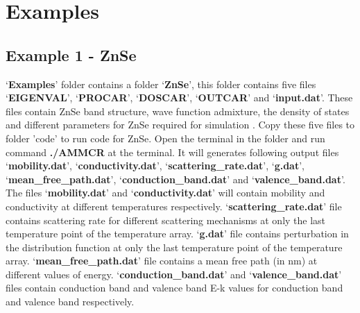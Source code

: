 \documentclass[12pt]{article}
\begin{document}
\section{Examples} \label{examples}
\subsection{Example 1 - ZnSe}
\lq \textbf{Examples}\rq \hspace{0.5mm} folder contains a folder \lq \textbf{ZnSe}\rq \hspace{0.5mm}, this folder contains five files \lq \textbf{EIGENVAL}\rq \hspace{0.5mm}, \lq \textbf{PROCAR}\rq \hspace{0.5mm}, \lq \textbf{DOSCAR}\rq \hspace{0.5mm}, \lq \textbf{OUTCAR}\rq \hspace{0.5mm} and \lq \textbf{input.dat}\rq \hspace{0.5mm}. These files contain ZnSe band structure, wave function admixture, the density of states and different parameters for ZnSe required for simulation \cite{anup1}. Copy these five files to folder 'code' to run code for ZnSe. Open the terminal in the folder and run command \textbf{./AMMCR} at the terminal. It will generates following output files \lq \textbf{mobility.dat}\rq \hspace{0.5mm}, \lq \textbf{conductivity.dat}\rq \hspace{0.5mm}, \lq \textbf{scattering\_rate.dat}\rq \hspace{0.5mm}, \lq \textbf{g.dat}\rq \hspace{0.5mm}, \lq \textbf{mean\_free\_path.dat}\rq \hspace{0.5mm}, \lq \textbf{conduction\_band.dat}\rq \hspace{0.5mm} and \lq \textbf{valence\_band.dat}\rq \hspace{0.5mm}. The files \lq \textbf{mobility.dat}\rq \hspace{0.5mm} and \lq \textbf{conductivity.dat}\rq \hspace{0.5mm} will contain mobility and conductivity at different temperatures respectively. \lq \textbf{scattering\_rate.dat}\rq \hspace{0.5mm}  file contains scattering rate for different scattering mechanisms at only the last temperature point of the temperature array. \lq \textbf{g.dat}\rq \hspace{0.5mm} file contains perturbation in the distribution function at only the last temperature point of the temperature array. \lq \textbf{mean\_free\_path.dat}\rq \hspace{0.5mm} file contains a mean free path (in nm) at different values of energy. \lq \textbf{conduction\_band.dat}\rq \hspace{0.5mm} and \lq \textbf{valence\_band.dat}\rq \hspace{0.5mm} files contain conduction band and valence band E-k values for conduction band and valence band respectively.
 
\end{document}
